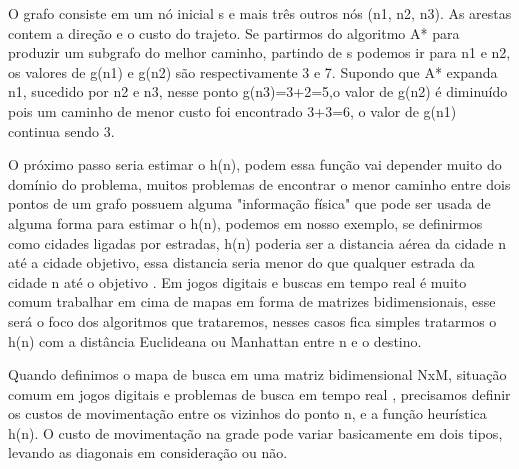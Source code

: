 \begin{minipage}{\linewidth}
    \label{fig:GrafoBusca}
\end{minipage}

O grafo consiste em um nó inicial s e mais três outros nós (n1, n2, n3). As arestas contem a direção e o custo do trajeto. Se partirmos do algoritmo A* para produzir um subgrafo do melhor caminho, partindo de s podemos ir para n1 e n2, os valores de g(n1) e g(n2) são respectivamente 3 e 7. Supondo que A* expanda n1, sucedido por n2 e n3, nesse ponto g(n3)=3+2=5,o valor de g(n2) é diminuído pois um caminho de menor custo foi encontrado  3+3=6, o valor de g(n1) continua sendo 3.

O próximo passo seria estimar o h(n), podem essa função vai depender muito do domínio do problema, muitos problemas de encontrar o menor caminho entre dois pontos de um grafo possuem alguma "informação física" que pode ser usada de alguma forma para estimar o h(n), podemos em nosso exemplo, se definirmos como cidades ligadas por estradas, h(n) poderia ser a distancia aérea da cidade n até a cidade objetivo, essa distancia seria menor do que qualquer estrada da cidade n até o objetivo \cite{PEHart}. Em jogos digitais e buscas em tempo real é muito comum trabalhar em cima de mapas em forma de matrizes bidimensionais, esse será o foco dos algoritmos que trataremos, nesses casos fica simples tratarmos o h(n) com a distância Euclideana ou Manhattan entre n e o destino. \cite{Yngvi}

Quando definimos o mapa de busca em uma matriz bidimensional NxM, situação comum em jogos digitais e problemas de busca em tempo real \cite{Ross_Graham} \cite{Ulysses} \cite{Ulysses2}, precisamos definir os custos de movimentação entre os vizinhos do ponto n, e a função heurística h(n). O custo de movimentação na grade pode variar basicamente em dois tipos, levando as diagonais em consideração ou não.

